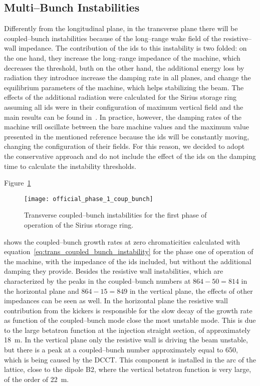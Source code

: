 \subsection{Multi--Bunch Instabilities}

    Differently from the longitudinal plane, in the transverse plane there will be coupled--bunch instabilities because of the long--range wake field of the resistive--wall impedance. The contribution of the \glspl{id} to this instability is two folded: on the one hand, they increase the long--range impedance of the machine, which decreases the threshold, buth on the other hand, the additional energy loss by radiation they introduce increase the damping rate in all planes, and change the equilibrium parameters of the machine, which helps stabilizing the beam. The effects of the additional radiation were calculated for the Sirius storage ring assuming all \glspl{id} were in their configuration of maximum vertical field and the main results can be found in~\cite{Sirius2013}. In practice, however, the damping rates of the machine will oscillate between the bare machine values and the maximum value presented in the mentioned reference because the \glspl{id} will be constantly moving, changing the configuration of their fields. For this reason, we decided to adopt the conservative approach and do not include the effect of the \glspl{id} on the damping time to calculate the instability thresholds.

    Figure~\ref{fig:ph1_coup_bunch}
    \begin{figure}
        \centering
        \texttt{[image: official\_phase\_1\_coup\_bunch]}
        \caption{Transverse coupled--bunch instabilities for the first phase of operation of the Sirius storage ring.}
        \label{fig:ph1_coup_bunch}
    \end{figure}
    shows the coupled--bunch growth rates at zero chromaticities calculated with equation~\ref{eq:trans_coupled_bunch_instability} for the phase one of operation of the machine, with the impedance of the \glspl{id} included, but without the additional damping they provide. Besides the resistive wall instabilities, which are characterized by the peaks in the coupled--bunch numbers at $864-50=814$ in the horizontal plane and $864-15=849$ in the vertical plane, the effects of other impedances can be seen as well. In the horizontal plane the resistive wall contribution from the kickers is responsible for the slow decay of the growth rate as function of the coupled--bunch mode close the most unstable mode. This is due to the large betatron function at the injection straight section, of approximately \SI{18}{\meter}. In the vertical plane only the resistive wall is driving the beam unstable, but there is a peak at a coupled--bunch number approximately equal to 650, which is being caused by the DCCT. This component is installed in the arc of the lattice, close to the dipole B2, where the vertical betatron function is very large, of the order of \SI{22}{\meter}.

